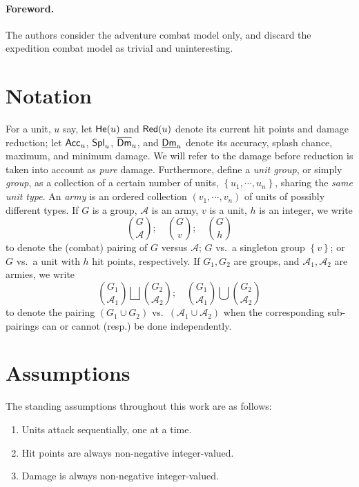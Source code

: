 \documentclass{article}
\newcommand{\set}[1]{\left\{#1\right\}}
\newcommand{\cA}{\mathcal{A}}
\DeclareMathOperator{\He}{{\sf He}} %
\DeclareMathOperator{\DLow}{\underline{\sf Dm}} %
\DeclareMathOperator{\DHigh}{\overline{\sf Dm}} %
\DeclareMathOperator{\Acc}{{\sf Acc}} %
\DeclareMathOperator{\Spl}{{\sf Spl}} %
\DeclareMathOperator{\Red}{{\sf Red}} %
\numberwithin{equation}{section}
\begin{document}
\paragraph*{Foreword.}
The authors consider the adventure combat model only, and discard the expedition combat model as trivial and uninteresting.

\section{Notation}

For a unit, $u$ say, let $\He (u)$ and $\Red (u)$ denote its current hit points and damage reduction; let $\Acc _u$, $\Spl _u$, $\DHigh _u$, and $\DLow _u$ denote its accuracy, splash chance, maximum, and minimum damage. We will refer to the damage before reduction is taken into account as \emph{pure} damage.
Furthermore, define a \emph{unit group}, or simply \emph{group}, as a collection of a certain number of units, $\set{u_1, \cdots , u_n}$, sharing the \emph{same unit type}.
An \emph{army} is an ordered collection $(v_1, \cdots , v_n)$ of units of possibly different types.
%
If $G$ is a group, $\cA $ is an army, $v$ is a unit, $h$ is an integer, we write
\[
    \binom{G}{\cA }; \quad \binom{G}{v}; \quad \binom{G}{h}
\]
to denote the (combat) pairing of $G$ versus $\cA $; $G$ vs.\ a singleton group $\set{v}$; or $G$ vs.\ a unit with $h$ hit points, respectively. If $G_1, G_2$ are groups, and $\cA _1, \cA _2$ are armies, we write
\[
    \binom{G_1}{\cA _1} \bigsqcup \binom{G_2}{\cA _2}; \quad \binom{G_1}{\cA _1} \bigcup \binom{G_2}{\cA _2}
\]
to denote the pairing $(G_1 \cup G_2)$ vs.\ $(\cA _1 \cup \cA _2)$ when the corresponding sub-pairings can or cannot (resp.) be done independently.

\section{Assumptions}

The standing assumptions throughout this work are as follows:
\begin{enumerate}
    \item Units attack sequentially, one at a time.
    \item Hit points are always non-negative integer-valued.
    \item Damage is always non-negative integer-valued.
\end{enumerate}
\end{document}
